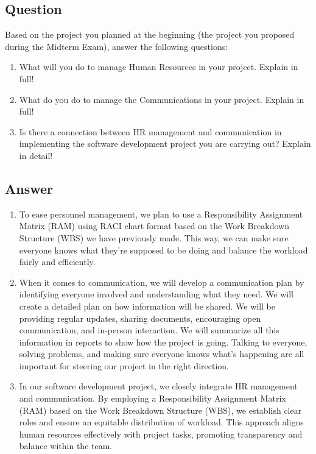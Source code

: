 \documentclass[12pt,titlepage]{article}
\begin{document}
\subsection*{Question}
\noindent
Based on the project you planned at the beginning (the project you proposed during the Midterm Exam), answer the following questions:
\begin{enumerate}
    \item What will you do to manage Human Resources in your project. Explain in full!
    \item What do you do to manage the Communications in your project. Explain in full!
    \item Is there a connection between HR management and communication in implementing the software development project you are carrying out? Explain in detail!
\end{enumerate}
\subsection*{Answer}
\begin{enumerate}
    \item To ease personnel management, we plan to use a Responsibility Assignment Matrix (RAM) using RACI chart format based on the Work Breakdown Structure (WBS) we have previously made. This way, we can make sure everyone knows what they're supposed to be doing and balance the workload fairly and efficiently.
    \item When it comes to communication, we will develop a communication plan by identifying everyone involved and understanding what they need. We will create a detailed plan on how information will be shared. We will be providing regular updates, sharing documents, encouraging open communication, and in-person interaction. We will summarize all this information in reports to show how the project is going. Talking to everyone, solving problems, and making sure everyone knows what's happening are all important for steering our project in the right direction. 
    \item In our software development project, we closely integrate HR management and communication. By employing a Responsibility Assignment Matrix (RAM) based on the Work Breakdown Structure (WBS), we establish clear roles and ensure an equitable distribution of workload. This approach aligns human resources effectively with project tasks, promoting transparency and balance within the team.
\end{enumerate}
\end{document}
